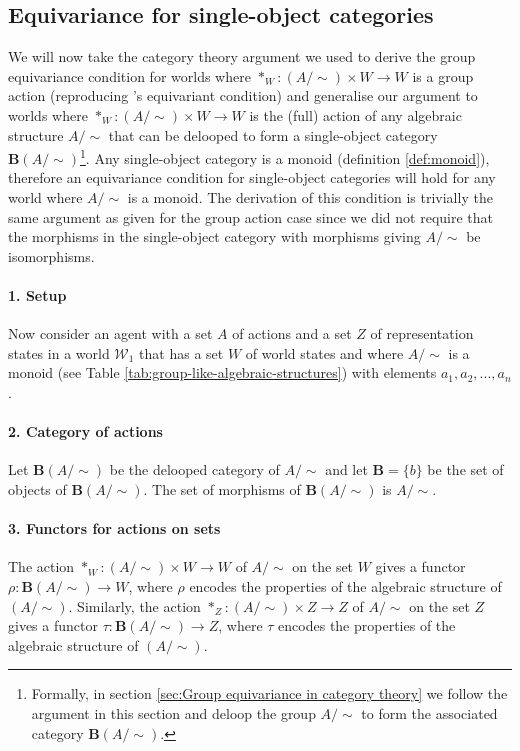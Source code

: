 \subsection{Equivariance for single-object categories}

We will now take the category theory argument we used to derive the group equivariance condition for worlds where $*_{W}: (A/\sim) \times W \to W$ is a group action (reproducing \autocite{Higgins2018}'s equivariant condition) and generalise our argument to worlds where $*_{W}: (A/\sim) \times W \to W$ is the (full) action of any algebraic structure $A/\sim$ that can be delooped to form a single-object category $\textbf{B}(A/\sim)$\footnote{Formally, in section \ref{sec:Group equivariance in category theory} we follow the argument in this section and deloop the group $A/\sim$ to form the associated category $\textbf{B}(A/\sim)$.}.
Any single-object category is a monoid (definition \ref{def:monoid}), therefore an equivariance condition for single-object categories will hold for any world where $A/\sim$ is a monoid.
The derivation of this condition is trivially the same argument as given for the group action case since we did not require that the morphisms in the single-object category with morphisms giving $A/\sim$ be isomorphisms.

\paragraph{1. Setup}
Now consider an agent with a set $A$ of actions and a set $Z$ of representation states in a world $\mathscr{W}_{1}$ that has a set $W$ of world states and where $A/\sim$ is a monoid (see Table \ref{tab:group-like-algebraic-structures}) with elements $a_{1}, a_{2}, ..., a_{n}$.

\paragraph{2. Category of actions}
Let $\textbf{B}(A/\sim)$ be the delooped category of $A/\sim$ and let $\textbf{B} = \{b\}$ be the set of objects of $\textbf{B}(A/\sim)$.
The set of morphisms of $\textbf{B}(A/\sim)$ is $A/\sim$.

\paragraph{3. Functors for actions on sets}
The action $*_{W}: (A/\sim) \times W \to W$ of $A/\sim$ on the set $W$ gives a functor $\rho: \textbf{B}(A/\sim) \to W$, where $\rho$ encodes the properties of the algebraic structure of $(A/\sim)$.
Similarly, the action $*_{Z}: (A/\sim) \times Z \to Z$ of $A/\sim$ on the set $Z$ gives a functor $\tau: \textbf{B}(A/\sim) \to Z$, where $\tau$ encodes the properties of the algebraic structure of $(A/\sim)$.

